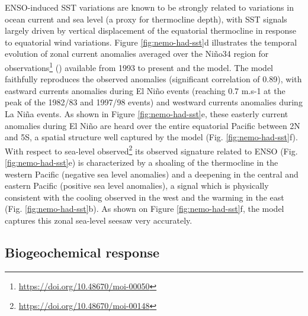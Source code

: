 ENSO-induced SST variations are known to be strongly related to variations in ocean current and sea level (a proxy for thermocline depth), with SST signals largely driven by vertical displacement of the equatorial thermocline in response to equatorial wind variations. Figure \ref{fig:nemo-had-sst}d illustrates the temporal evolution of zonal current anomalies averaged over the Niño34 region for observations\footnote{\url{https://doi.org/10.48670/moi-00050}} (\citealp{rioGOCEOceanCirculation2014}) available from 1993 to present and the model. The model faithfully reproduces the observed anomalies (significant correlation of 0.89), with eastward currents anomalies during El Niño events (reaching 0.7 m.s-1 at the peak of the 1982/83 and 1997/98 events) and westward currents anomalies during La Niña events. As shown in Figure \ref{fig:nemo-had-sst}e, these easterly current anomalies during El Niño are heard over the entire equatorial Pacific between 2N and 5S, a spatial structure well captured by the model (Fig. \ref{fig:nemo-had-sst}f).
With respect to sea-level observed\footnote{\url{https://doi.org/10.48670/moi-00148}} its observed signature related to ENSO (Fig. \ref{fig:nemo-had-sst}e) is characterized by a shoaling of the thermocline in the western Pacific (negative sea level anomalies) and a deepening in the central and eastern Pacific (positive sea level anomalies), a signal which is physically consistent with the cooling observed in the west and the warming in the east (Fig. \ref{fig:nemo-had-sst}b). As shown on Figure \ref{fig:nemo-had-sst}f, the model captures this zonal sea-level seesaw very accurately.

\subsection{Biogeochemical response}

